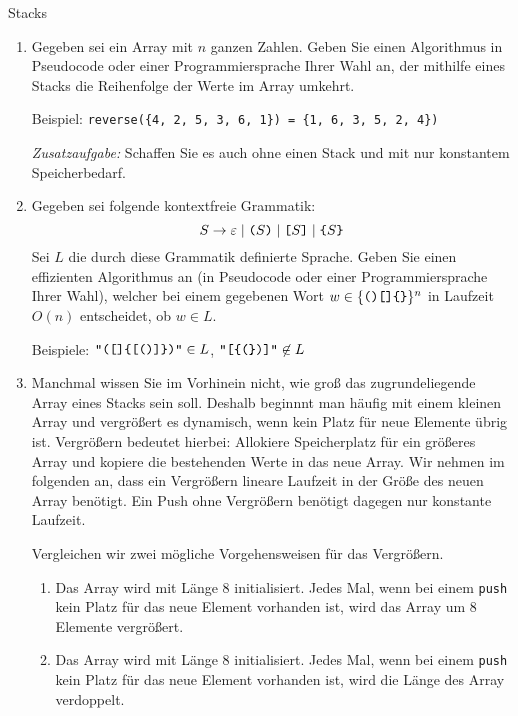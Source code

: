 \documentclass[11pt,a4paper]{article}
\begin{document}
\begin{aufgabe}{5}{Stacks}
    \begin{enumerate}
        \item
        Gegeben sei ein Array mit $n$ ganzen Zahlen.
        Geben Sie einen Algorithmus in Pseudocode oder einer Programmiersprache Ihrer Wahl an, der mithilfe eines Stacks die Reihenfolge der Werte im Array umkehrt.

        Beispiel: \texttt{reverse(\{4, 2, 5, 3, 6, 1\}) = \{1, 6, 3, 5, 2, 4\})}

        \emph{Zusatzaufgabe:} Schaffen Sie es auch ohne einen Stack und mit nur konstantem Speicherbedarf.

        \item Gegeben sei folgende kontextfreie Grammatik:
        \begin{equation*}
            S \rightarrow
            \epsilon \mid
            \text{\texttt{(}}S\text{\texttt{)}} \mid
            \text{\texttt{[}}S\text{\texttt{]}} \mid
            \text{\texttt{\{}}S\text{\texttt{\}}}
        \end{equation*}
        Sei $L$ die durch diese Grammatik definierte Sprache.
        Geben Sie einen effizienten Algorithmus an (in Pseudocode oder einer Programmiersprache Ihrer Wahl), welcher bei einem gegebenen Wort $w \in \{\text{\texttt{()[]\{\}}}\}^n$ in Laufzeit $O(n)$ entscheidet, ob $w \in L$.

        Beispiele: $\text{\texttt{"([]\{[()]\})"}} \in L$, $\text{\texttt{"[\{(\})]"}} \not\in L$

        \item
        Manchmal wissen Sie im Vorhinein nicht, wie groß das zugrundeliegende Array eines Stacks sein soll.
        Deshalb beginnnt man häufig mit einem \glqq{}kleinen\grqq{} Array und vergrößert es dynamisch, wenn kein Platz für neue Elemente übrig ist.
        Vergrößern bedeutet hierbei: Allokiere Speicherplatz für ein größeres Array und kopiere die bestehenden Werte in das neue Array.
        Wir nehmen im folgenden an, dass ein Vergrößern lineare Laufzeit in der Größe des neuen Array benötigt.
        Ein Push ohne Vergrößern benötigt dagegen nur konstante Laufzeit.

        Vergleichen wir zwei mögliche Vorgehensweisen für das Vergrößern.
        \begin{enumerate}[label=(\roman*)]
            \item Das Array wird mit Länge 8 initialisiert.
            Jedes Mal, wenn bei einem \texttt{push} kein Platz für das neue Element vorhanden ist, wird das Array um 8 Elemente vergrößert.
            \item Das Array wird mit Länge 8 initialisiert.
            Jedes Mal, wenn bei einem \texttt{push} kein Platz für das neue Element vorhanden ist, wird die Länge des Array verdoppelt.
        \end{enumerate}


\end{enumerate}
\end{aufgabe}
\end{document}
